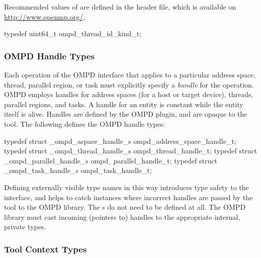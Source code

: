 Recommended values of  are defined in the  
header file, which is available on \url{http://www.openmp.org/}. 

\label{ompd:ompd_thread_id_kind_t}
\format

\begin{ccppspecific}
\begin{ompSyntax}
typedef uint64_t ompd_thread_id_kind_t;
\end{ompSyntax}
\end{ccppspecific}


\subsubsection{OMPD Handle Types}
\label{ompd:ompd_address_space_handle_t}
\label{ompd:ompd_thread_handle_t}
\label{ompd:ompd_parallel_handle_t}
\label{ompd:ompd_task_handle_t}

Each operation of the OMPD interface that applies to a particular address space, thread, parallel 
region, or task must explicitly specify
a \emph{handle} for the operation.
OMPD employs handles for address spaces (for a host or target device), threads, parallel regions, 
and tasks. A handle for an entity is constant while the entity itself is alive. Handles are defined by 
the OMPD plugin, and are opaque to the tool. The following defines the OMPD 
handle types:

\format

\begin{ccppspecific}
\begin{ompSyntax}
typedef struct _ompd_aspace_handle_s ompd_address_space_handle_t;
typedef struct _ompd_thread_handle_s ompd_thread_handle_t;
typedef struct _ompd_parallel_handle_s ompd_parallel_handle_t;
typedef struct _ompd_task_handle_s ompd_task_handle_t;
\end{ompSyntax}
\end{ccppspecific}


Defining externally visible type names in this way introduces type safety to the interface, and helps 
to catch instances where incorrect handles are passed by the tool to the OMPD 
library. The s do not need to be defined at all. The OMPD library 
must cast incoming (pointers to) handles to the appropriate internal, private types.

\subsubsection{Tool Context Types}
\label{ompd:ompd_address_space_context_t}
\label{ompd:ompd_thread_context_t}


